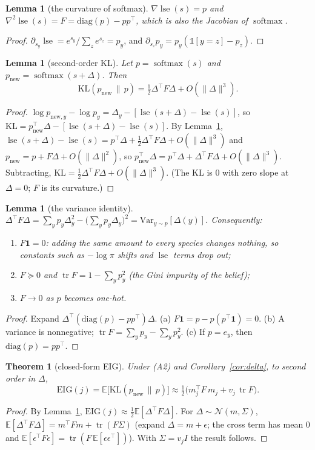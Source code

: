 \documentclass[11pt]{article}
\theoremstyle{plain}
\newtheorem{lem}[prop]{Lemma}
\newtheorem{thm}[prop]{Theorem}
\theoremstyle{remark}
\newcommand{\EIG}{\mathrm{EIG}}
\newcommand{\KL}{\mathrm{KL}}
\newcommand{\Var}{\mathrm{Var}}
\newcommand{\one}{\mathbf{1}}
\newcommand{\lse}{\operatorname{lse}}
\newcommand{\tr}{\operatorname{tr}}
\begin{document}
\begin{lem}[the curvature of softmax]\label{lem:hess}
$\nabla\lse(s)=p$ and $\nabla^2\lse(s)=F=\mathrm{diag}(p)-pp^\top$, which is also the Jacobian of $\operatorname{softmax}$.
\end{lem}
\begin{proof}
$\partial_{s_y}\lse=e^{s_y}/\sum_z e^{s_z}=p_y$, and $\partial_{s_z}p_y=p_y(\mathbb 1[y=z]-p_z)$.
\end{proof}

\begin{lem}[second-order KL]\label{lem:taylor}
Let $p=\operatorname{softmax}(s)$ and $p_{\text{new}}=\operatorname{softmax}(s+\Delta)$. Then
\[ \KL(p_{\text{new}}\,\|\,p)=\tfrac12\Delta^\top F\Delta+O(\|\Delta\|^3). \]
\end{lem}
\begin{proof}
$\log p_{\text{new},y}-\log p_y=\Delta_y-[\lse(s+\Delta)-\lse(s)]$, so $\KL=p_{\text{new}}^\top\Delta-[\lse(s+\Delta)-\lse(s)]$. By Lemma~\ref{lem:hess}, $\lse(s+\Delta)-\lse(s)=p^\top\Delta+\frac12\Delta^\top F\Delta+O(\|\Delta\|^3)$ and $p_{\text{new}}=p+F\Delta+O(\|\Delta\|^2)$, so $p_{\text{new}}^\top\Delta=p^\top\Delta+\Delta^\top F\Delta+O(\|\Delta\|^3)$. Subtracting, $\KL=\frac12\Delta^\top F\Delta+O(\|\Delta\|^3)$. (The KL is 0 with zero slope at $\Delta=0$; $F$ is its curvature.)
\end{proof}

\begin{lem}[the variance identity]\label{lem:var}
$\Delta^\top F\Delta=\sum_y p_y\Delta_y^2-\big(\sum_y p_y\Delta_y\big)^2=\Var_{y\sim p}[\Delta(y)]$. Consequently:
\begin{enumerate}[label=(\alph*)]
  \item $F\one=0$: adding the same amount to every species changes nothing, so constants such as $-\log\pi$ shifts and $\lse$ terms drop out;
  \item $F\succeq0$ and $\tr F=1-\sum_y p_y^2$ (the Gini impurity of the belief);
  \item $F\to0$ as $p$ becomes one-hot.
\end{enumerate}
\end{lem}
\begin{proof}
Expand $\Delta^\top(\mathrm{diag}(p)-pp^\top)\Delta$. (a) $F\one=p-p(p^\top\one)=0$. (b) A variance is nonnegative; $\tr F=\sum_yp_y-\sum_yp_y^2$. (c) If $p=e_y$, then $\mathrm{diag}(p)=pp^\top$.
\end{proof}

\begin{thm}[closed-form EIG]\label{thm:eig}
Under (A2) and Corollary~\ref{cor:delta}, to second order in $\Delta$,
\[ \EIG(j)=\mathbb E\big[\KL(p_{\text{new}}\,\|\,p)\big]\approx\tfrac12\big(m_j^\top F\,m_j+v_j\,\tr F\big). \]
\end{thm}
\begin{proof}
By Lemma~\ref{lem:taylor}, $\EIG(j)\approx\frac12\mathbb E[\Delta^\top F\Delta]$. For $\Delta\sim\mathcal N(m,\Sigma)$, $\mathbb E[\Delta^\top F\Delta]=m^\top Fm+\tr(F\Sigma)$ (expand $\Delta=m+\epsilon$; the cross term has mean 0 and $\mathbb E[\epsilon^\top F\epsilon]=\tr(F\,\mathbb E[\epsilon\epsilon^\top])$). With $\Sigma=v_jI$ the result follows.
\end{proof}
\end{document}
